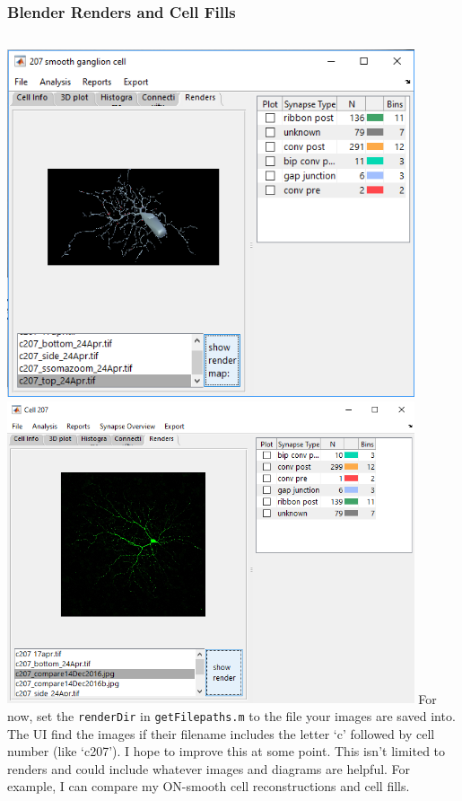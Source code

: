 \documentclass[11pt]{beamer}
\begin{document}
\begin{frame}
	\frametitle{Blender Renders and Cell Fills}
	\begin{columns}
		\includegraphics[width=0.9\textwidth]{c207_render}
		\hskip10pt
		\includegraphics[width=0.9\textwidth]{c207_cellfill}
		For now, set the \texttt{renderDir} in \texttt{getFilepaths.m} to the file your images are saved into. The UI find the images if their filename includes the letter `c' followed by cell number (like `c207'). I hope to improve this at some point.
		\vskip15pt
		This isn't limited to renders and could include whatever images and diagrams are helpful. For example, I can compare my ON-smooth cell reconstructions and cell fills.
	\end{columns}
\end{frame}
\end{document}
